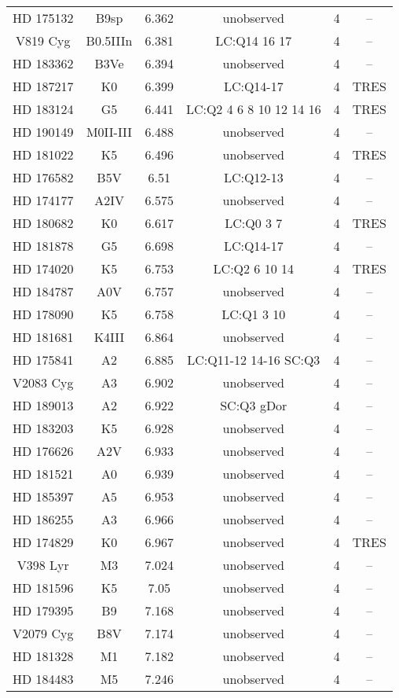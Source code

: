 \begin{table*}
\begin{tabular}{cccccc}
HD 175132 & B9sp & 6.362 & unobserved & 4 & -- \\
V819 Cyg & B0.5IIIn & 6.381 & LC:Q14 16 17 & 4 & -- \\
HD 183362 & B3Ve & 6.394 & unobserved & 4 & -- \\
HD 187217 & K0 & 6.399 & LC:Q14-17 & 4 & TRES \\
HD 183124 & G5 & 6.441 & LC:Q2 4 6 8 10 12 14 16 & 4 & TRES \\
HD 190149 & M0II-III & 6.488 & unobserved & 4 & -- \\
HD 181022 & K5 & 6.496 & unobserved & 4 & TRES \\
HD 176582 & B5V & 6.51 & LC:Q12-13 & 4 & -- \\
HD 174177 & A2IV & 6.575 & unobserved & 4 & -- \\
HD 180682 & K0 & 6.617 & LC:Q0 3 7 & 4 & TRES \\
HD 181878 & G5 & 6.698 & LC:Q14-17 & 4 & -- \\
HD 174020 & K5 & 6.753 & LC:Q2 6 10 14 & 4 & TRES \\
HD 184787 & A0V & 6.757 & unobserved & 4 & -- \\
HD 178090 & K5 & 6.758 & LC:Q1 3 10 & 4 & -- \\
HD 181681 & K4III & 6.864 & unobserved & 4 & -- \\
HD 175841 & A2 & 6.885 & LC:Q11-12 14-16 SC:Q3 & 4 & -- \\
V2083 Cyg & A3 & 6.902 & unobserved & 4 & -- \\
HD 189013 & A2 & 6.922 & SC:Q3 gDor & 4 & -- \\
HD 183203 & K5 & 6.928 & unobserved & 4 & -- \\
HD 176626 & A2V & 6.933 & unobserved & 4 & -- \\
HD 181521 & A0 & 6.939 & unobserved & 4 & -- \\
HD 185397 & A5 & 6.953 & unobserved & 4 & -- \\
HD 186255 & A3 & 6.966 & unobserved & 4 & -- \\
HD 174829 & K0 & 6.967 & unobserved & 4 & TRES \\
V398 Lyr & M3 & 7.024 & unobserved & 4 & -- \\
HD 181596 & K5 & 7.05 & unobserved & 4 & -- \\
HD 179395 & B9 & 7.168 & unobserved & 4 & -- \\
V2079 Cyg & B8V & 7.174 & unobserved & 4 & -- \\
HD 181328 & M1 & 7.182 & unobserved & 4 & -- \\
HD 184483 & M5 & 7.246 & unobserved & 4 & -- \\
\hline
\end{tabular}
\end{table*}
